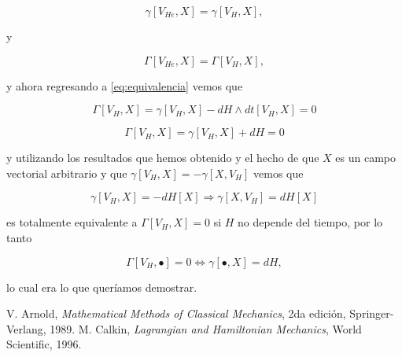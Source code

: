 \documentclass[a4paper,10pt]{article}
\numberwithin{equation}{section}
\begin{document}
\begin{equation}
 \gamma[V_{He},X] = \gamma[V_H,X],
\end{equation}

y

\begin{equation}
 \Gamma[V_{He},X] = \Gamma[V_H,X],
\end{equation}

y ahora regresando a \eqref{eq:equivalencia} vemos que 

\begin{equation}
 \Gamma[V_H,X] = \gamma[V_H,X] - dH \wedge dt[V_H,X] = 0
\end{equation}

\begin{equation}
 \Gamma[V_H,X] = \gamma[V_H,X] + dH = 0
\end{equation}

y utilizando los resultados que hemos obtenido y el hecho de que $X$ es un campo 
vectorial arbitrario y que $ \gamma[V_H,X] =  - \gamma[X,V_H]$ vemos que 

\begin{equation}
 \gamma[V_H,X] = - dH[X] \Rightarrow \gamma[X,V_H] = dH[X]
\end{equation}

es totalmente equivalente a $\Gamma[V_H,X] = 0$ si $H$ no depende del tiempo, por lo tanto 

\begin{equation}
 \Gamma[V_H,\bullet] = 0 \Leftrightarrow \gamma[\bullet,X] = dH,
\end{equation}

lo cual era lo que queríamos demostrar. 

\begin{thebibliography}{10}
V. Arnold, \emph{Mathematical Methods of Classical Mechanics}, 2da edición, Springer-Verlang, 
1989.
M. Calkin, \emph{Lagrangian and Hamiltonian Mechanics}, World Scientific, 1996.
\end{thebibliography}
\end{document}
